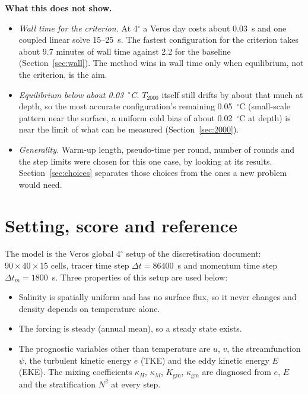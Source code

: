 \documentclass{article}
\begin{document}
\textbf{What this does not show.}
\begin{itemize}
\item \emph{Wall time for the criterion.} At 4$^\circ$ a Veros day costs about 0.03~s and one coupled linear solve 15--25~s. The fastest configuration for the criterion takes about 9.7 minutes of wall time against 2.2 for the baseline (Section~\ref{sec:wall}). The method wins in wall time only when equilibrium, not the criterion, is the aim.
\item \emph{Equilibrium below about 0.03~$^\circ$C.} $T_{2000}$ itself still drifts by about that much at depth, so the most accurate configuration's remaining 0.05~$^\circ$C (small-scale pattern near the surface, a uniform cold bias of about 0.02~$^\circ$C at depth) is near the limit of what can be measured (Section~\ref{sec:2000}).
\item \emph{Generality.} Warm-up length, pseudo-time per round, number of rounds and the step limits were chosen for this one case, by looking at its results. Section~\ref{sec:choices} separates those choices from the ones a new problem would need.
\end{itemize}

\section{Setting, score and reference}\label{sec:setting}

The model is the Veros global 4$^\circ$ setup of the discretisation document: $90\times40\times15$ cells, tracer time step $\Delta t = 86400$~s and momentum time step $\Delta t_m=1800$~s. Three properties of this setup are used below:
\begin{itemize}
\item Salinity is spatially uniform and has no surface flux, so it never changes and density depends on temperature alone.
\item The forcing is steady (annual mean), so a steady state exists.
\item The prognostic variables other than temperature are $u$, $v$, the streamfunction $\psi$, the turbulent kinetic energy $e$ (TKE) and the eddy kinetic energy $E$ (EKE). The mixing coefficients $\kappa_H$, $\kappa_M$, $K_\text{gm}$, $\kappa_\text{gm}$ are diagnosed from $e$, $E$ and the stratification $N^2$ at every step.
\end{itemize}
\end{document}
